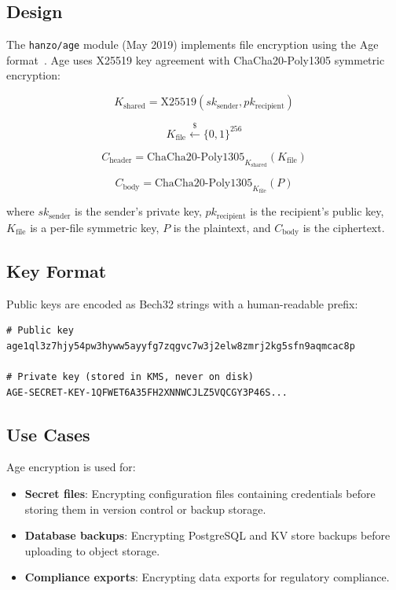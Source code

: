 \documentclass[11pt,a4paper]{article}
\begin{document}
\subsection{Design}

The \texttt{hanzo/age} module (May 2019) implements file encryption using the Age format~\cite{age2019}. Age uses X25519 key agreement with ChaCha20-Poly1305 symmetric encryption:

\begin{equation}
    K_{\text{shared}} = \text{X25519}(sk_{\text{sender}}, pk_{\text{recipient}})
\end{equation}

\begin{equation}
    K_{\text{file}} \xleftarrow{\$} \{0, 1\}^{256}
\end{equation}

\begin{equation}
    C_{\text{header}} = \text{ChaCha20-Poly1305}_{K_{\text{shared}}}(K_{\text{file}})
\end{equation}

\begin{equation}
    C_{\text{body}} = \text{ChaCha20-Poly1305}_{K_{\text{file}}}(P)
\end{equation}

where $sk_{\text{sender}}$ is the sender's private key, $pk_{\text{recipient}}$ is the recipient's public key, $K_{\text{file}}$ is a per-file symmetric key, $P$ is the plaintext, and $C_{\text{body}}$ is the ciphertext.

\subsection{Key Format}

Public keys are encoded as Bech32 strings with a human-readable prefix:

\begin{lstlisting}[caption=Age key pair format.]
# Public key
age1ql3z7hjy54pw3hyww5ayyfg7zqgvc7w3j2elw8zmrj2kg5sfn9aqmcac8p

# Private key (stored in KMS, never on disk)
AGE-SECRET-KEY-1QFWET6A35FH2XNNWCJLZ5VQCGY3P46S...
\end{lstlisting}

\subsection{Use Cases}

Age encryption is used for:
\begin{itemize}
    \item \textbf{Secret files}: Encrypting configuration files containing credentials before storing them in version control or backup storage.
    \item \textbf{Database backups}: Encrypting PostgreSQL and KV store backups before uploading to object storage.
    \item \textbf{Compliance exports}: Encrypting data exports for regulatory compliance.
\end{itemize}
\end{document}
